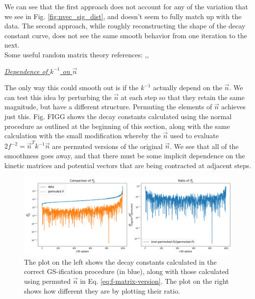 \documentclass[11pt]{article}
\begin{document}
We can see that the first approach does not account for any of the variation that we see in Fig. \ref{fig:nvec_sig_dist}, and doesn't seem to fully match up with the data. The second approach, while roughly reconstructing the shape of the decay constant curve, does not see the same smooth behavior from one iteration to the next. \\

\noindent Some useful random matrix theory references: \cite{Livan_2018},\cite{WignerMPThms},\cite{RMTguide}

\begin{center}
    \noindent \underline{\textit{Dependence of $k^{-1}$ on $\vec{n}$}}
\end{center}

The only way this could smooth out is if the $k^{-1}$ actually depend on the $\vec{n}$. We can test this idea by perturbing the $\vec{n}$ at each step so that they retain the same magnitude, but have a different structure. Permuting the elements of $\vec{n}$ achieves just this. Fig. FIGG shows the decay constants calculated using the normal procedure as outlined at the beginning of this section, along with the same calculation with the small modification whereby the $\vec{n}$ used to evaluate $2f^{-2}=\vec{n}^Tk^{-1}\vec{n}$ are permuted versions of the original $\vec{n}$. We see that all of the smoothness goes away, and that there must be some implicit dependence on the kinetic matrices and potential vectors that are being contracted at adjacent steps.

\begin{figure}[h]
    \centering
    \includegraphics[width=0.95\linewidth]{figs/k-depends-on-n.png}
    \caption{The plot on the left shows the decay constants calculated in the correct GS-ification procedure (in blue), along with those calculated using permuted $\vec{n}$ in Eq. \eqref{eq:f-matrix-version}. The plot on the right shows how different they are by plotting their ratio.}
    \label{fig:permuted-n}
\end{figure}
\end{document}
